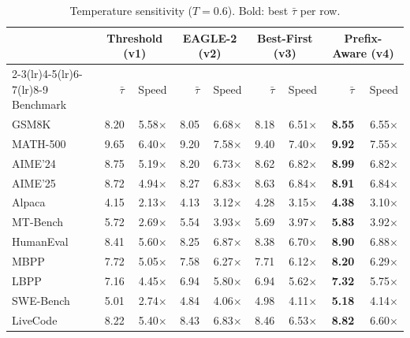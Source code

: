 \begin{table}[t]
\centering\small
\caption{Temperature sensitivity ($T{=}0.6$). Bold: best $\bar{\tau}$ per row.}
\label{tab:ablation-temp}
\begin{tabular}{@{}l rr rr rr rr@{}}
\toprule
& \multicolumn{2}{c}{Threshold (v1)} & \multicolumn{2}{c}{EAGLE-2 (v2)} & \multicolumn{2}{c}{Best-First (v3)} & \multicolumn{2}{c}{Prefix-Aware (v4)} \\
\cmidrule(lr){2-3}\cmidrule(lr){4-5}\cmidrule(lr){6-7}\cmidrule(lr){8-9}
Benchmark & $\bar{\tau}$ & Speed & $\bar{\tau}$ & Speed & $\bar{\tau}$ & Speed & $\bar{\tau}$ & Speed \\
\midrule
GSM8K & 8.20 & 5.58$\times$ & 8.05 & 6.68$\times$ & 8.18 & 6.51$\times$ & \textbf{8.55} & 6.55$\times$ \\
MATH-500 & 9.65 & 6.40$\times$ & 9.20 & 7.58$\times$ & 9.40 & 7.40$\times$ & \textbf{9.92} & 7.55$\times$ \\
AIME'24 & 8.75 & 5.19$\times$ & 8.20 & 6.73$\times$ & 8.62 & 6.82$\times$ & \textbf{8.99} & 6.82$\times$ \\
AIME'25 & 8.72 & 4.94$\times$ & 8.27 & 6.83$\times$ & 8.63 & 6.84$\times$ & \textbf{8.91} & 6.84$\times$ \\
Alpaca & 4.15 & 2.13$\times$ & 4.13 & 3.12$\times$ & 4.28 & 3.15$\times$ & \textbf{4.38} & 3.10$\times$ \\
MT-Bench & 5.72 & 2.69$\times$ & 5.54 & 3.93$\times$ & 5.69 & 3.97$\times$ & \textbf{5.83} & 3.92$\times$ \\
HumanEval & 8.41 & 5.60$\times$ & 8.25 & 6.87$\times$ & 8.38 & 6.70$\times$ & \textbf{8.90} & 6.88$\times$ \\
MBPP & 7.72 & 5.05$\times$ & 7.58 & 6.27$\times$ & 7.71 & 6.12$\times$ & \textbf{8.20} & 6.29$\times$ \\
LBPP & 7.16 & 4.45$\times$ & 6.94 & 5.80$\times$ & 6.94 & 5.62$\times$ & \textbf{7.32} & 5.75$\times$ \\
SWE-Bench & 5.01 & 2.74$\times$ & 4.84 & 4.06$\times$ & 4.98 & 4.11$\times$ & \textbf{5.18} & 4.14$\times$ \\
LiveCode & 8.22 & 5.40$\times$ & 8.43 & 6.83$\times$ & 8.46 & 6.53$\times$ & \textbf{8.82} & 6.60$\times$ \\
\bottomrule
\end{tabular}
\end{table}
